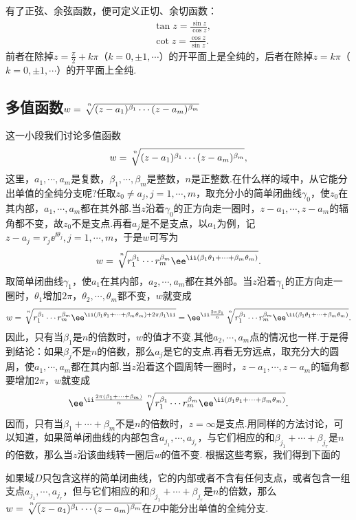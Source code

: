 有了正弦、余弦函数，便可定义正切、余切函数：
\begin{align*}
  &\tan z=\frac{\sin z}{\cos z},\\
  &\cot z=\frac{\cos z}{\sin z}.
\end{align*}
前者在除掉$z=\frac\pi2+k\pi$（$k=0,\pm1,\cdots$）的开平面上是全纯的，后者在除掉$z=k\pi$（$k=0,\pm1,\cdots$）的开平面上全纯.

\subsection{多值函数\texorpdfstring{$w=\sqrt[\leftroot{-2}\uproot{6}n]{(z-a_1)^{\beta_1}\cdots(z-a_m)^{\beta_m}}$}{}}

这一小段我们讨论多值函数
\[w=\sqrt[\leftroot{-2}\uproot{6} n]{(z-a_1)^{\beta_1}\cdots(z-a_m)^{\beta_m}},\]
这里，$a_1,\cdots,a_m$是复数，$\beta_1,\cdots,\beta_m$是整数，$n$是正整数.在什么样的域中，从它能分出单值的全纯分支呢?任取$z_0\ne a_j,j=1,\cdots,m$，取充分小的简单闭曲线$\gamma_0$，使$z_0$在其内部，$a_1,\cdots,a_m$都在其外部.当$z$沿着$\gamma_0$的正方向走一圈时，$z-a_1,\cdots,z-a_m$的辐角都不变，故$z_0$不是支点.再看$a_j$是不是支点，以$a_1$为例，记$z-a_j=r_j\ee^{\ii\theta_j},j=1,\cdots,m$，于是$w$可写为
\[w=\sqrt[\uproot{6}\leftroot{-2} n]{r_1^{\beta_1}\cdots r_m^{\beta_m}\ee^{\ii(\beta_1\theta_1+\cdots+\beta_m\theta_m)}}.\]
取简单闭曲线$\gamma_1$，使$a_1$在其内部，$a_2,\cdots,a_m$都在其外部。当$z$沿着$\gamma_1$的正方向走一圈时，$\theta_1$增加$2\pi$，$\theta_2,\cdots,\theta_m$都不变，$w$就变成
\[w=\sqrt[\leftroot{-2}\uproot{6}n]{r_1^{\beta_1}\cdots r_m^{\beta_m}\ee^{\ii(\beta_1\theta_1+\cdots+\beta_m\theta_m)+2\pi\beta_1\ii}}
=\ee^{\ii\frac{2\pi\beta_1}n}\sqrt[\leftroot{-2}\uproot{6}n]{r_1^{\beta_1}\cdots r_m^{\beta_m}\ee^{\ii(\beta_1\theta_1+\cdots+\beta_m\theta_m)}}.\]
因此，只有当$\beta_1$是$n$的倍数时，$w$的值才不变.其他$a_2,\cdots,a_m$点的情况也一样.于是得到结论：如果$\beta_j$不是$n$的倍数，那么$a_j$是它的支点.再看无穷远点，取充分大的圆周，使$a_1,\cdots,a_m$都在其内部.当$z$沿着这个圆周转一圈时，$z-a_1,\cdots,z-a_m$的辐角都要增加$2\pi$，$w$就变成
\[\ee^{\ii\frac{2\pi(\beta_1+\cdots+\beta_m)}n}\sqrt[\leftroot{-2}\uproot{6}n]{r_1^{\beta_1}\cdots r_m^{\beta_m}\ee^{\ii(\beta_1\theta_1+\cdots+\beta_m\theta_m)}}.\]
因而，只有当$\beta_1+\cdots+\beta_m$不是$n$的倍数时，$z=\infty$是支点.用同样的方法讨论，可以知道，如果简单闭曲线的内部包含$a_{j_1},\cdots,a_{j_r}$，与它们相应的和$\beta_{j_1}+\cdots+\beta_{j_r}$是$n$的倍数，那么当$z$沿该曲线转一圈后$w$的值不变. 根据这些考察，我们得到下面的
\begin{theorem}\label{thm2.4.7}
如果域$D$只包含这样的简单闭曲线，它的内部或者不含有任何支点，或者包含一组支点$a_{j_1},\cdots,a_{j_r}$，但与它们相应的和$\beta_ {j_1}+\cdots+\beta_{j_r}$是$n$的倍数，那么$w=\sqrt[\leftroot{-2}\uproot{6} n]{(z-a_1)^{\beta_1}\cdots(z-a_m)^{\beta_m}}$在$D$中能分出单值的全纯分支.
\end{theorem}

